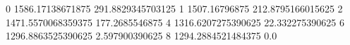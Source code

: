 0 1586.17138671875 291.8829345703125
1 1507.16796875 212.8795166015625
2 1471.5570068359375 177.2685546875
4 1316.6207275390625 22.332275390625
6 1296.8863525390625 2.597900390625
8 1294.2884521484375 0.0
